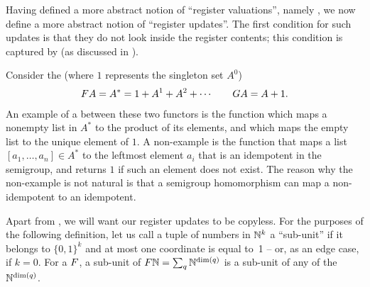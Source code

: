 Having defined a more abstract notion of \enquote{register valuations}, namely
, we now define a more abstract notion of
\enquote{register updates}. The first condition for such updates is that they do
not look inside the register contents; this condition is captured by
 (as discussed in ).

\begin{example}
    Consider the  (where $1$ represents the singleton set $A^0$)
    \begin{align*}
    \functor A = A^* = 1 + A^1 + A^2 + \cdots  \qquad \functorg A = A + 1.     \end{align*} 
An example of a  between these two functors is the function which maps a nonempty list in $A^*$ to the product of its elements, and which maps the empty list to the unique element of $1$. A non-example is the function that maps a list $[a_1,\ldots,a_n] \in A^*$ to the leftmost element $a_i$ that is an idempotent in the semigroup, and returns $1$ if such an element does not exist. The reason why the non-example is not natural is that a semigroup homomorphism can map a non-idempotent to an idempotent.
\end{example}


Apart from , we will want our register updates to be copyless.
For the purposes of the following definition, let us call a tuple of numbers in
${\mathbb N}^k$ a \enquote{sub-unit} if it belongs to $\{0,1\}^k$ and at most one
coordinate is equal to~1 -- or, as an edge case, if $k=0$. For a  $\functor$, a sub-unit of $\functor\Nat = \sum_q \Nat^{\dim(q)}$ is a
sub-unit of any of the ${\mathbb N}^{\dim(q)}$.

